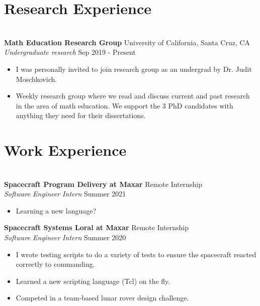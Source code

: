 \documentclass[10pt,letterpaper]{article}
\begin{document}
\section*{Research Experience} \vspace*{-12pt} \hrulefill \vspace*{6pt} \\
\textbf{Math Education Research Group} \hfill University of California, Santa
Cruz, CA\\
\textit{Undergraduate research} \hfill Sep 2019 - Present\\
\begin{itemize} \itemsep -1mm
\vspace*{-10pt} 
    \item I was personally invited to join research group as an undergrad by Dr.
    Judit Moschkovich.
    \item Weekly research group where we read and discuss current and past
    research in the area of math education. We support the 3 PhD candidates with
    anything they need for their dissertations.
\end{itemize}

\section*{Work Experience} \vspace*{-12pt} \hrulefill \vspace*{6pt} \\
\textbf{Spacecraft Program Delivery at Maxar} \hfill Remote Internship\\
\textit{Software Engineer Intern} \hfill Summer 2021\\
\vspace*{-10pt} \begin{itemize} \itemsep -1mm
    \item Learning a new language?
\end{itemize}

\noindent
\textbf{Spacecraft Systems Loral at Maxar} \hfill Remote Internship\\
\textit{Software Engineer Intern} \hfill Summer 2020\\
\vspace*{-10pt} \begin{itemize} \itemsep -1mm
    \item I wrote testing scripts to do a variety of tests to ensure the
    spacecraft reacted correctly to commanding.
    \item Learned a new scripting language (Tcl) on the fly.
    \item Competed in a team-based lunar rover design challenge.
\end{itemize}
\end{document}
